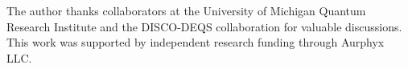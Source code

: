 \documentclass[aps,prl,twocolumn,superscriptaddress]{revtex4-2}
\begin{document}
\begin{acknowledgments}
The author thanks collaborators at the University of Michigan Quantum Research 
Institute and the DISCO-DEQS collaboration for valuable discussions. This work 
was supported by independent research funding through Aurphyx LLC.
\end{acknowledgments}




\end{document}
